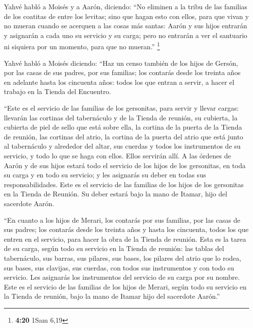  Yahvé habló a Moisés y a Aarón, diciendo:
 ``No eliminen a la tribu de las familias de los coatitas
de entre los levitas;  sino que hagan esto con ellos,
para que vivan y no mueran cuando se acerquen a las cosas más santas:
Aarón y sus hijos entrarán y asignarán a cada uno su servicio y su
carga;  pero no entrarán a ver el santuario ni siquiera
por un momento, para que no mueran.'' \footnote{\textbf{4:20} 1Sam 6,19}

 Yahvé habló a Moisés diciendo:  ``Haz un
censo también de los hijos de Gersón, por las casas de sus padres, por
sus familias;  los contarás desde los treinta años en
adelante hasta los cincuenta años: todos los que entran a servir, a
hacer el trabajo en la Tienda del Encuentro.

 ``Este es el servicio de las familias de los gersonitas,
para servir y llevar cargas:  llevarán las cortinas del
tabernáculo y de la Tienda de reunión, su cubierta, la cubierta de piel
de sello que está sobre ella, la cortina de la puerta de la Tienda de
reunión,  las cortinas del atrio, la cortina de la puerta
del atrio que está junto al tabernáculo y alrededor del altar, sus
cuerdas y todos los instrumentos de su servicio, y todo lo que se haga
con ellos. Ellos servirán allí.  A las órdenes de Aarón y
de sus hijos estará todo el servicio de los hijos de los gersonitas, en
toda su carga y en todo su servicio; y les asignarás su deber en todas
sus responsabilidades.  Este es el servicio de las
familias de los hijos de los gersonitas en la Tienda de Reunión. Su
deber estará bajo la mano de Itamar, hijo del sacerdote Aarón.

 ``En cuanto a los hijos de Merari, los contarás por sus
familias, por las casas de sus padres;  los contarás
desde los treinta años y hasta los cincuenta, todos los que entren en el
servicio, para hacer la obra de la Tienda de reunión. 
Esta es la tarea de su carga, según todo su servicio en la Tienda de
reunión: las tablas del tabernáculo, sus barras, sus pilares, sus bases,
 los pilares del atrio que lo rodea, sus bases, sus
clavijas, sus cuerdas, con todos sus instrumentos y con todo su
servicio. Les asignarás los instrumentos del servicio de su carga por su
nombre.  Este es el servicio de las familias de los hijos
de Merari, según todo su servicio en la Tienda de reunión, bajo la mano
de Itamar hijo del sacerdote Aarón.''

